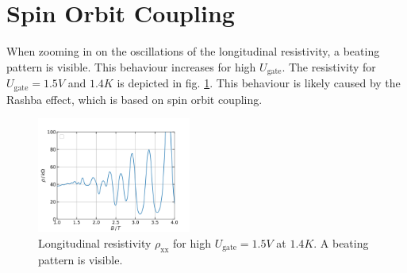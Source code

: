 \section{Spin Orbit Coupling}

When zooming in on the oscillations of the longitudinal resistivity, 
a beating pattern is visible.
This behaviour increases for high $U_\text{gate}$.
The resistivity for $U_\text{gate} = 1.5V$ and $1.4K$ is depicted in fig. \ref{fig:beatingPattern}.
This behaviour is likely caused by the Rashba effect, which is based on spin orbit coupling.
\begin{figure}[h]
    \centering
    \includegraphics[width=0.45\textwidth]{../Images/beatingPattern.png}
    \caption{Longitudinal resistivity $\rho_\text{xx}$ for high $U_\text{gate} = 1.5V$ at $1.4K$.
    A beating pattern is visible.
    }
    \label{fig:beatingPattern}
\end{figure}
